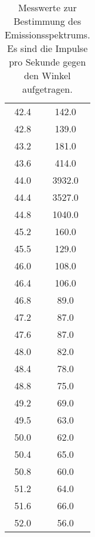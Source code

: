 \begin{table}[h]
\begin{tabular}{S S}
    42.4 & 142.0\\
    42.8 & 139.0\\
    43.2 & 181.0\\
    43.6 & 414.0\\
    44.0 & 3932.0\\
    44.4 & 3527.0\\
    44.8 & 1040.0\\
    45.2 & 160.0\\
    45.5 & 129.0\\
    46.0 & 108.0\\
    46.4 & 106.0\\
    46.8 & 89.0\\
    47.2 & 87.0\\
    47.6 & 87.0\\
    48.0 & 82.0\\
    48.4 & 78.0\\
    48.8 & 75.0\\
    49.2 & 69.0\\
    49.5 & 63.0\\
    50.0 & 62.0\\
    50.4 & 65.0\\
    50.8 & 60.0\\
    51.2 & 64.0\\
    51.6 & 66.0\\
    52.0 & 56.0\\
    \bottomrule
  \end{tabular}
  \caption{Messwerte zur Bestimmung des Emissionsspektrums. Es sind die
  Impulse pro Sekunde gegen den Winkel aufgetragen.}
  \label{tab:emission}
\end{table}

